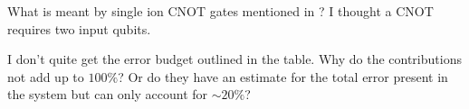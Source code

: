 \documentclass{alex_summary}
\begin{document}
\begin{question1}
	What is meant by single ion CNOT gates mentioned in \autocite{schmidt-kaler_realization_2003}? I thought a CNOT requires two input qubits.
\end{question1}

\begin{question3}
	I don't quite get the error budget outlined in the table. Why do the contributions not add up to \( 100 \unit{\percent} \)? Or do they have an estimate for the total error present in the system but can only account for \( \sim 20 \unit{\percent} \)?
\end{question3}

\printbibliography
\end{document}
